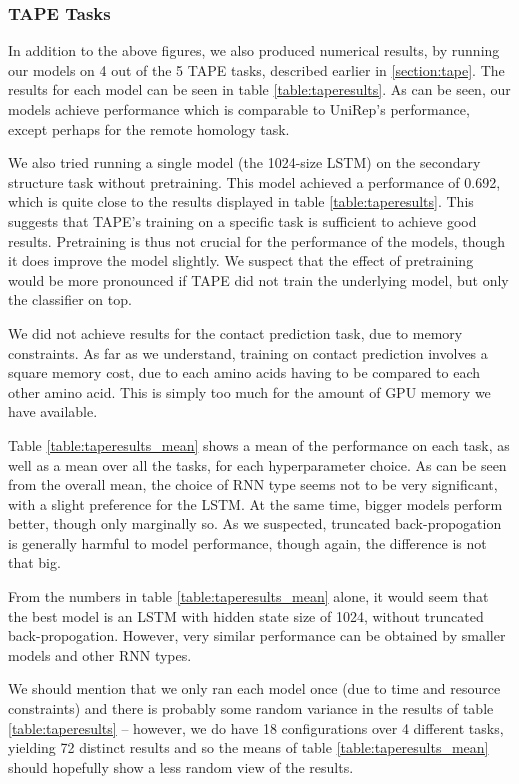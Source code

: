 \documentclass[a4paper,12pt]{article}
\begin{document}
\subsubsection{TAPE Tasks}
\label{section:TAPE_results}
In addition to the above figures, we also produced numerical results, by running our models on 4 out of the 5 TAPE tasks, described earlier in \ref{section:tape}. The results for each model can be seen in table \ref{table:taperesults}. As can be seen, our models achieve performance which is comparable to UniRep's performance, except perhaps for the remote homology task.

We also tried running a single model (the 1024-size LSTM) on the secondary structure task without pretraining. This model achieved a performance of 0.692, which is quite close to the results displayed in table \ref{table:taperesults}. This suggests that TAPE's training on a specific task is sufficient to achieve good results. Pretraining is thus not crucial for the performance of the models, though it does improve the model slightly. We suspect that the effect of pretraining would be more pronounced if TAPE did not train the underlying model, but only the classifier on top.

We did not achieve results for the contact prediction task, due to memory constraints. As far as we understand, training on contact prediction involves a square memory cost, due to each amino acids having to be compared to each other amino acid. This is simply too much for the amount of GPU memory we have available.

Table \ref{table:taperesults_mean} shows a mean of the performance on each task, as well as a mean over all the tasks, for each hyperparameter choice. As can be seen from the overall mean, the choice of RNN type seems not to be very significant, with a slight preference for the LSTM. At the same time, bigger models perform better, though only marginally so. As we suspected, truncated back-propogation is generally harmful to model performance, though again, the difference is not that big.

From the numbers in table \ref{table:taperesults_mean} alone, it would seem that the best model is an LSTM with hidden state size of 1024, without truncated back-propogation. However, very similar performance can be obtained by smaller models and other RNN types.

We should mention that we only ran each model once (due to time and resource constraints) and there is probably some random variance in the results of table \ref{table:taperesults} -- however, we do have 18 configurations over 4 different tasks, yielding 72 distinct results and so the means of table \ref{table:taperesults_mean} should hopefully show a less random view of the results.
\end{document}
